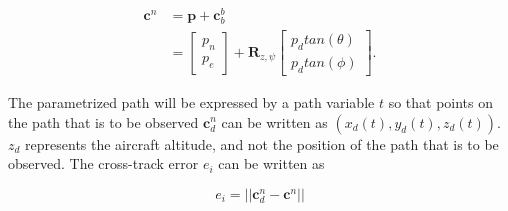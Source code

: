 \begin{equation}
\begin{split}
	\mathbf{c}^n & = \mathbf{p} + \mathbf{c}_b^b \\
	& =
	\begin{bmatrix}
		p_n \\ p_e
	\end{bmatrix}
	+ \mathbf{R}_{z,\psi}
	\begin{bmatrix}
		p_d tan(\theta) \\ p_d tan(\phi)
	\end{bmatrix}.
\end{split}
\end{equation}

The parametrized path will be expressed by a path variable $t$ so that points on the path that is to be observed $\mathbf{c}_d^n$ can be written as $(x_d(t), y_d(t), z_d(t))$. $z_d$ represents the aircraft altitude, and not the position of the path that is to be observed. The cross-track error $e_i$ can be written as

\begin{equation}
	e_i = ||\mathbf{c}_d^n - \mathbf{c}^n||
\end{equation}